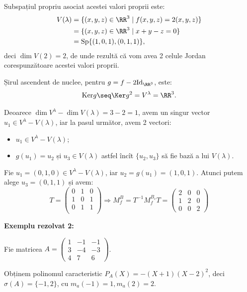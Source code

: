 Subspațiul propriu asociat acestei valori proprii este:
\begin{align*}
  V(\lambda) &= \{ (x, y, z) \in \RR^3 \mid f(x, y, z) = 2(x, y, z) \} \\
             &= \{ (x, y, z) \in \RR^3 \mid x + y - z = 0 \} \\
             &= \mathrm{Sp}\{(1, 0, 1), (0, 1, 1) \},
\end{align*}
deci $\dim V(2) = 2$, de unde rezultă că vom avea 2 celule Jordan corespunzătoare
acestei valori proprii.

Șirul ascendent de nuclee, pentru $g = f - 2\mathrm{Id}_{\RR^3}$, este:
\[
  \mathrm{Ker} g \seq \Ker g^2 = V^\lambda = \RR^3.
\]

Deoarece $\dim V^\lambda - \dim V(\lambda) = 3 - 2 = 1$, avem un singur vector
$u_1 \in V^\lambda - V(\lambda)$, iar la pasul următor, avem 2 vectori:
\begin{itemize}
\item $u_1 \in V^\lambda - V(\lambda)$;
\item $g(u_1) = u_2$ și $u_3 \in V(\lambda)$ astfel încît $\{u_2, u_3\}$ să fie bază a
  lui $V(\lambda)$.
\end{itemize}

Fie $u_1 = (0, 1, 0) \in V^{\lambda} - V(\lambda)$, iar $u_2 = g(u_1) = (1, 0, 1)$.
Atunci putem alege $u_3  = (0, 1, 1)$ și avem:
\[
  T =
  \begin{pmatrix}
    0 & 1 & 0 \\
    1 & 0 & 1 \\
    0 & 1 & 1 \\
  \end{pmatrix} \Rightarrow M_f^B = T^{-1}M_f^{B_c} T =
  \begin{pmatrix}
    2 & 0 & 0 \\
    1 & 2 & 0 \\
    0 & 0 & 2
  \end{pmatrix}
\]


\vspace{1cm}

\textbf{Exemplu rezolvat 2:}

Fie matricea $ A = \begin{pmatrix} 1 & -1 & -1 \\ 3 & -4 & -3 \\ 4 & 7 & 6 \end{pmatrix} $.

Obținem polinomul caracteristic $ P_A(X) = -(X + 1)(X - 2)^2$, deci
$ \sigma(A) = \{ -1, 2 \} $, cu $ m_a(-1) = 1, m_a(2) = 2 $.

